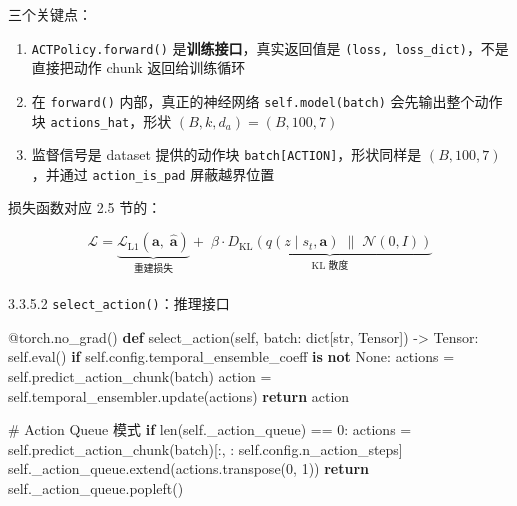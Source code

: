 \documentclass[
  chinese,
]{ctexart}
\makeatletter
\let\oldparagraph\paragraph
\renewcommand{\paragraph}{
    \@ifstar
      \xxxParagraphStar
      \xxxParagraphNoStar
  }
\newcommand{\xxxParagraphStar}[1]{\oldparagraph*{#1}\mbox{}}
\newcommand{\xxxParagraphNoStar}[1]{\oldparagraph{#1}\mbox{}}
\newenvironment{Shaded}{\begin{snugshade}}{\end{snugshade}}
\newcommand{\AttributeTok}[1]{\textcolor[rgb]{0.40,0.45,0.13}{#1}}
\newcommand{\BuiltInTok}[1]{\textcolor[rgb]{0.00,0.23,0.31}{#1}}
\newcommand{\CommentTok}[1]{\textcolor[rgb]{0.37,0.37,0.37}{#1}}
\newcommand{\ControlFlowTok}[1]{\textcolor[rgb]{0.00,0.23,0.31}{\textbf{#1}}}
\newcommand{\DecValTok}[1]{\textcolor[rgb]{0.68,0.00,0.00}{#1}}
\newcommand{\KeywordTok}[1]{\textcolor[rgb]{0.00,0.23,0.31}{\textbf{#1}}}
\newcommand{\NormalTok}[1]{\textcolor[rgb]{0.00,0.23,0.31}{#1}}
\newcommand{\OperatorTok}[1]{\textcolor[rgb]{0.37,0.37,0.37}{#1}}
\newcommand{\VariableTok}[1]{\textcolor[rgb]{0.07,0.07,0.07}{#1}}
\providecommand{\tightlist}{%
  \setlength{\itemsep}{0pt}\setlength{\parskip}{0pt}}
\makeatother
\begin{document}
三个关键点：

\begin{enumerate}
\def\labelenumi{\arabic{enumi}.}
\tightlist
\item
  \texttt{ACTPolicy.forward()} 是\textbf{训练接口}，真实返回值是
  \texttt{(loss,\ loss\_dict)}，不是直接把动作 chunk 返回给训练循环
\item
  在 \texttt{forward()} 内部，真正的神经网络 \texttt{self.model(batch)}
  会先输出整个动作块 \texttt{actions\_hat}，形状
  \((B, k, d_a) = (B, 100, 7)\)
\item
  监督信号是 dataset 提供的动作块 \texttt{batch{[}ACTION{]}}，形状同样是
  \((B, 100, 7)\)，并通过 \texttt{action\_is\_pad} 屏蔽越界位置
\end{enumerate}

损失函数对应 2.5 节的：

\[
\mathcal{L} = \underbrace{\mathcal{L}_{\text{L1}}(\mathbf{a},\; \hat{\mathbf{a}})}_{\text{重建损失}} + \;\beta \cdot \underbrace{D_{\text{KL}}\!\left(q(z \mid s_t, \mathbf{a}) \;\|\; \mathcal{N}(0, I)\right)}_{\text{KL 散度}}
\]

\paragraph{\texorpdfstring{3.3.5.2
\texttt{select\_action()}：推理接口}{3.3.5.2 select\_action()：推理接口}}\label{select_actionux63a8ux7406ux63a5ux53e3}

\begin{Shaded}
\begin{Highlighting}[]
\AttributeTok{@torch.no\_grad}\NormalTok{()}
\KeywordTok{def}\NormalTok{ select\_action(}\VariableTok{self}\NormalTok{, batch: }\BuiltInTok{dict}\NormalTok{[}\BuiltInTok{str}\NormalTok{, Tensor]) }\OperatorTok{{-}\textgreater{}}\NormalTok{ Tensor:}
    \VariableTok{self}\NormalTok{.}\BuiltInTok{eval}\NormalTok{()}
    \ControlFlowTok{if} \VariableTok{self}\NormalTok{.config.temporal\_ensemble\_coeff }\KeywordTok{is} \KeywordTok{not} \VariableTok{None}\NormalTok{:}
\NormalTok{        actions }\OperatorTok{=} \VariableTok{self}\NormalTok{.predict\_action\_chunk(batch)}
\NormalTok{        action }\OperatorTok{=} \VariableTok{self}\NormalTok{.temporal\_ensembler.update(actions)}
        \ControlFlowTok{return}\NormalTok{ action}

    \CommentTok{\# Action Queue 模式}
    \ControlFlowTok{if} \BuiltInTok{len}\NormalTok{(}\VariableTok{self}\NormalTok{.\_action\_queue) }\OperatorTok{==} \DecValTok{0}\NormalTok{:}
\NormalTok{        actions }\OperatorTok{=} \VariableTok{self}\NormalTok{.predict\_action\_chunk(batch)[:, : }\VariableTok{self}\NormalTok{.config.n\_action\_steps]}
        \VariableTok{self}\NormalTok{.\_action\_queue.extend(actions.transpose(}\DecValTok{0}\NormalTok{, }\DecValTok{1}\NormalTok{))}
    \ControlFlowTok{return} \VariableTok{self}\NormalTok{.\_action\_queue.popleft()}
\end{Highlighting}
\end{Shaded}
\end{document}
